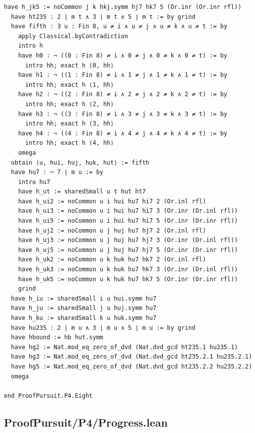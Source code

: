 \documentclass[11pt,a4paper]{article}
\begin{document}
\begin{Verbatim}[breaklines,breakanywhere,fontsize=\footnotesize]
  have h_jk5 := noCommon j k hkj.symm hj7 hk7 5 (Or.inr (Or.inr rfl))
  have ht235 : 2 ∣ m t ∧ 3 ∣ m t ∧ 5 ∣ m t := by grind
  have fifth : ∃ u : Fin 8, u ≠ i ∧ u ≠ j ∧ u ≠ k ∧ u ≠ t := by
    apply Classical.byContradiction
    intro h
    have h0 : ¬ ((0 : Fin 8) ≠ i ∧ 0 ≠ j ∧ 0 ≠ k ∧ 0 ≠ t) := by
      intro hh; exact h ⟨0, hh⟩
    have h1 : ¬ ((1 : Fin 8) ≠ i ∧ 1 ≠ j ∧ 1 ≠ k ∧ 1 ≠ t) := by
      intro hh; exact h ⟨1, hh⟩
    have h2 : ¬ ((2 : Fin 8) ≠ i ∧ 2 ≠ j ∧ 2 ≠ k ∧ 2 ≠ t) := by
      intro hh; exact h ⟨2, hh⟩
    have h3 : ¬ ((3 : Fin 8) ≠ i ∧ 3 ≠ j ∧ 3 ≠ k ∧ 3 ≠ t) := by
      intro hh; exact h ⟨3, hh⟩
    have h4 : ¬ ((4 : Fin 8) ≠ i ∧ 4 ≠ j ∧ 4 ≠ k ∧ 4 ≠ t) := by
      intro hh; exact h ⟨4, hh⟩
    omega
  obtain ⟨u, hui, huj, huk, hut⟩ := fifth
  have hu7 : ¬ 7 ∣ m u := by
    intro hu7
    have h_ut := sharedSmall u t hut ht7
    have h_ui2 := noCommon u i hui hu7 hi7 2 (Or.inl rfl)
    have h_ui3 := noCommon u i hui hu7 hi7 3 (Or.inr (Or.inl rfl))
    have h_ui5 := noCommon u i hui hu7 hi7 5 (Or.inr (Or.inr rfl))
    have h_uj2 := noCommon u j huj hu7 hj7 2 (Or.inl rfl)
    have h_uj3 := noCommon u j huj hu7 hj7 3 (Or.inr (Or.inl rfl))
    have h_uj5 := noCommon u j huj hu7 hj7 5 (Or.inr (Or.inr rfl))
    have h_uk2 := noCommon u k huk hu7 hk7 2 (Or.inl rfl)
    have h_uk3 := noCommon u k huk hu7 hk7 3 (Or.inr (Or.inl rfl))
    have h_uk5 := noCommon u k huk hu7 hk7 5 (Or.inr (Or.inr rfl))
    grind
  have h_iu := sharedSmall i u hui.symm hu7
  have h_ju := sharedSmall j u huj.symm hu7
  have h_ku := sharedSmall k u huk.symm hu7
  have hu235 : 2 ∣ m u ∧ 3 ∣ m u ∧ 5 ∣ m u := by grind
  have hbound := hb hut.symm
  have hg2 := Nat.mod_eq_zero_of_dvd (Nat.dvd_gcd ht235.1 hu235.1)
  have hg3 := Nat.mod_eq_zero_of_dvd (Nat.dvd_gcd ht235.2.1 hu235.2.1)
  have hg5 := Nat.mod_eq_zero_of_dvd (Nat.dvd_gcd ht235.2.2 hu235.2.2)
  omega

end ProofPursuit.P4.Eight
\end{Verbatim}

\subsection{ProofPursuit/P4/Progress.lean}\label{proofpursuitp4progress.lean}
\end{document}
